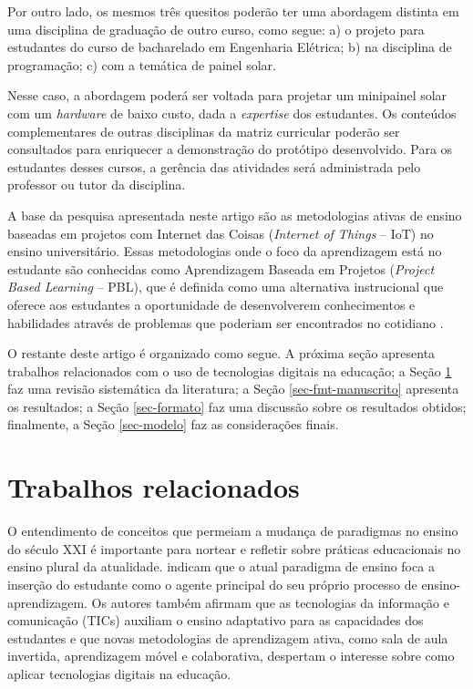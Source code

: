 \documentclass[portuguese]{textolivre}
\begin{document}
Por outro lado, os mesmos três quesitos poderão ter uma abordagem distinta em uma disciplina de graduação de outro curso, como segue: a) o projeto para estudantes do curso de bacharelado em Engenharia Elétrica; b) na disciplina de programação; c) com a temática de painel solar.

Nesse caso, a abordagem poderá ser voltada para projetar um minipainel solar com um \textit{hardware} de baixo custo, dada a \textit{expertise} dos estudantes. Os conteúdos complementares de outras disciplinas da matriz curricular poderão ser consultados para enriquecer a demonstração do protótipo desenvolvido. Para os estudantes desses cursos, a gerência das atividades será administrada pelo professor ou tutor da disciplina. 	

A base da pesquisa apresentada neste artigo são as metodologias ativas de ensino baseadas em projetos com Internet das Coisas (\textit{Internet of Things} – IoT) no ensino universitário. Essas metodologias onde o foco da aprendizagem está no estudante são conhecidas como Aprendizagem Baseada em Projetos (\textit{Project Based Learning} – PBL), que é definida como uma alternativa instrucional que oferece aos estudantes a oportunidade de desenvolverem conhecimentos e habilidades através de problemas que poderiam ser encontrados no cotidiano \cite{powerschool_project-based_nodate}. 

O restante deste artigo é organizado como segue. A próxima seção apresenta trabalhos relacionados com o uso de tecnologias digitais na educação; a Seção \ref{sec-normas} faz uma revisão sistemática da literatura; a Seção \ref{sec-fmt-manuscrito} apresenta os resultados; a Seção \ref{sec-formato} faz uma discussão sobre os resultados obtidos; finalmente, a Seção \ref{sec-modelo} faz as considerações finais.

\section{Trabalhos relacionados}\label{sec-normas}
O entendimento de conceitos que permeiam a mudança de paradigmas no ensino do século XXI é importante para nortear e refletir sobre práticas educacionais no ensino plural da atualidade. \textcite{romero_tecnologias_2020} indicam que o atual paradigma de ensino foca a inserção do estudante como o agente principal do seu próprio processo de ensino-aprendizagem. Os autores também afirmam que as tecnologias da informação e comunicação (TICs) auxiliam o ensino adaptativo para as capacidades dos estudantes e que novas metodologias de aprendizagem ativa, como sala de aula invertida, aprendizagem móvel e colaborativa, despertam o interesse sobre como aplicar tecnologias digitais na educação.
\end{document}
